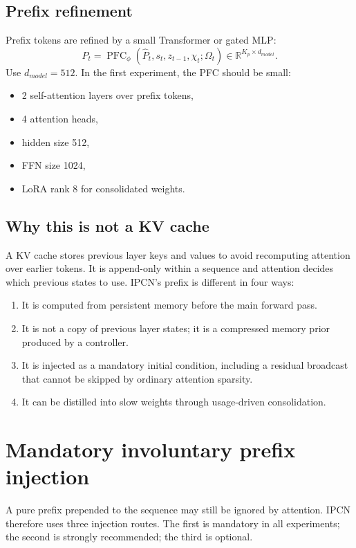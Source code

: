 \documentclass[11pt]{article}
\newcommand{\R}{\mathbb{R}}
\begin{document}
\subsection{Prefix refinement}

Prefix tokens are refined by a small Transformer or gated MLP:
\begin{equation}
    P_t = \operatorname{PFC}_\phi(\hat{P}_t, s_t,z_{t-1},\chi_t;\Omega_t)\in\R^{K_p\times d_{model}}.
\end{equation}
Use \(d_{model}=512\). In the first experiment, the PFC should be small:
\begin{itemize}
    \item 2 self-attention layers over prefix tokens,
    \item 4 attention heads,
    \item hidden size 512,
    \item FFN size 1024,
    \item LoRA rank 8 for consolidated weights.
\end{itemize}

\subsection{Why this is not a KV cache}

A KV cache stores previous layer keys and values to avoid recomputing attention over earlier tokens. It is append-only within a sequence and attention decides which previous states to use. IPCN's prefix is different in four ways:
\begin{enumerate}
    \item It is computed from persistent memory before the main forward pass.
    \item It is not a copy of previous layer states; it is a compressed memory prior produced by a controller.
    \item It is injected as a mandatory initial condition, including a residual broadcast that cannot be skipped by ordinary attention sparsity.
    \item It can be distilled into slow weights through usage-driven consolidation.
\end{enumerate}

\section{Mandatory involuntary prefix injection}

A pure prefix prepended to the sequence may still be ignored by attention. IPCN therefore uses three injection routes. The first is mandatory in all experiments; the second is strongly recommended; the third is optional.
\end{document}
